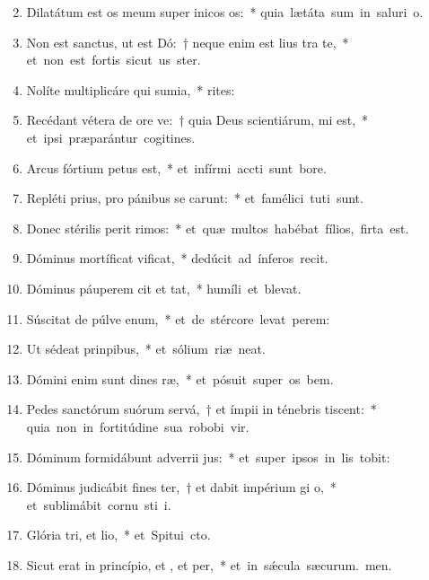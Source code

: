 \begin{flushleft}
\begin{enumerate}[leftmargin=*]
\setcounter{enumi}{1}

\item Dilatátum est os meum super inicos os:~* \mbox{quia lætáta sum in saluri o.}
\item Non est sanctus, ut est Dó:~† neque enim est lius tra te,~* \mbox{et non est fortis sicut us ster.}
\item Nolíte multiplicáre qui sumia,~* \mbox{rites:}
\item Recédant vétera de ore ve:~† quia Deus scientiárum, mi est,~* \mbox{et ipsi præparántur cogitines.}
\item Arcus fórtium petus est,~* \mbox{et infírmi accti sunt bore.}
\item Repléti prius, pro pánibus se carunt:~* \mbox{et famélici tuti sunt.}
\item Donec stérilis perit rimos:~* \mbox{et quæ multos habébat fílios, firta est.}
\item Dóminus mortíficat  vificat,~* \mbox{dedúcit ad ínferos  recit.}
\item Dóminus páuperem cit et tat,~* \mbox{humíli et blevat.}
\item Súscitat de púlve enum,~* \mbox{et de stércore levat perem:}
\item Ut sédeat  prinpibus,~* \mbox{et sólium riæ neat.}
\item Dómini enim sunt dines ræ,~* \mbox{et pósuit super os bem.}
\item Pedes sanctórum suórum servá,~† et ímpii in ténebris tiscent:~* \mbox{quia non in fortitúdine sua robobi vir.}
\item Dóminum formidábunt adverrii jus:~* \mbox{et super ipsos in lis tobit:}
\item Dóminus judicábit fines ter,~† et dabit impérium gi o,~* \mbox{et sublimábit cornu sti i.}
\item Glória tri, et lio,~* \mbox{et Spitui cto.}
\item Sicut erat in princípio, et , et per,~* \mbox{et in s\'{\ae}cula sæcurum. men.}


\end{enumerate}
\end{flushleft}
